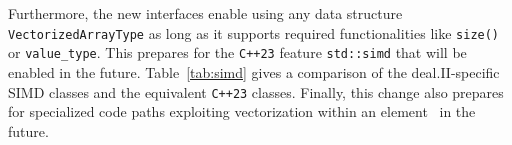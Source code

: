 \documentclass{ansarticle-preprint}
\begin{document}
Furthermore, the new interfaces enable using any data structure
\texttt{VectorizedArrayType} as long as it supports required
functionalities like \texttt{size()} or \texttt{value\_type}. This prepares
for the \texttt{C++23} feature \texttt{std::simd} that will be enabled in the future.
Table~\ref{tab:simd} gives a comparison of the deal.II-specific SIMD classes and
the equivalent \texttt{C++23} classes. Finally, this change also prepares for specialized
code paths exploiting
vectorization within an element~\cite{KronbichlerKormann2019} in the future.


\end{document}
